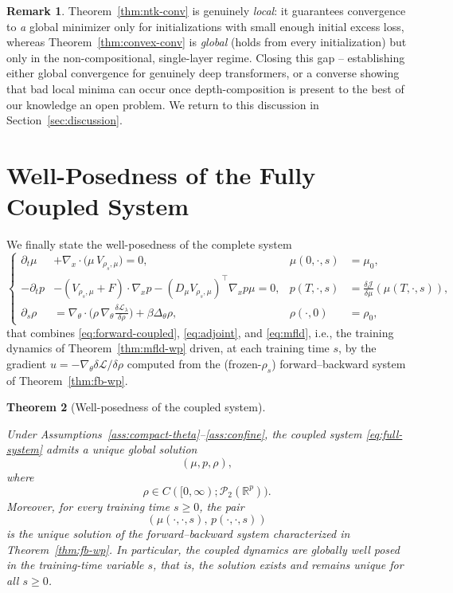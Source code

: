 \documentclass[11pt,a4wide]{article}
\newtheorem{theorem}{Theorem}[section]
\theoremstyle{definition}
\newtheorem{remark}[theorem]{Remark}
\newcommand{\R}{\mathbb{R}}
\newcommand{\Prob}{\mathcal{P}}
\begin{document}
\begin{remark}
Theorem~\ref{thm:ntk-conv} is genuinely \emph{local}: it guarantees convergence to \emph{a} global minimizer only for initializations with small enough initial excess loss, whereas Theorem~\ref{thm:convex-conv} is \emph{global} (holds from every initialization) but only in the non-compositional, single-layer regime. Closing this gap -- establishing either global convergence for genuinely deep transformers, or a converse showing that bad local minima can occur once depth-composition is present  to the best of our knowledge  an open problem. We return to this discussion in Section~\ref{sec:discussion}.
\end{remark}

\section{Well-Posedness of the Fully Coupled System}
\label{sec:coupled}

We finally state the well-posedness of the complete system
\begin{equation}
\left\{
\begin{aligned}
\partial_t\mu &+ \nabla_x\cdot\big(\mu\,V_{\rho_s,\mu}\big) = 0, & \mu(0,\cdot,s)&=\mu_0,\\
-\partial_tp &- (V_{\rho_s,\mu}+F)\cdot\nabla_xp - (D_\mu V_{\rho_s,\mu})^\top \nabla_x p \mu  = 0, & p(T,\cdot,s) &= \tfrac{\delta\mathcal J}{\delta\mu}(\mu(T,\cdot,s)),\\
\partial_s\rho &= \nabla_\theta\cdot\big(\rho\,\nabla_\theta\tfrac{\delta\mathcal L_\lambda}{\delta\rho}\big) + \beta\Delta_\theta\rho, & \rho(\cdot,0) &= \rho_0,
\end{aligned}
\right.
\label{eq:full-system}
\end{equation}
that combines \eqref{eq:forward-coupled}, \eqref{eq:adjoint}, and \eqref{eq:mfld}, i.e., the training dynamics of Theorem~\ref{thm:mfld-wp} driven, at each training time $s$, by the gradient $u=-\nabla_\theta\delta\mathcal L/\delta\rho$ computed from the (frozen-$\rho_s$) forward--backward system of Theorem~\ref{thm:fb-wp}.

\begin{theorem}[Well-posedness of the coupled system]
\label{thm:full-wp}

Under Assumptions~\ref{ass:compact-theta}--\ref{ass:confine}, the coupled system
\eqref{eq:full-system} admits a unique global solution
\[
(\mu,p,\rho),
\]
where
\[
\rho\in C([0,\infty);\Prob_2(\mathbb R^p)).
\]
Moreover, for every training time $s\ge0$, the pair
\[
(\mu(\cdot,\cdot,s),\,p(\cdot,\cdot,s))
\]
is the unique solution of the forward--backward system characterized in
Theorem~\ref{thm:fb-wp}. In particular, the coupled dynamics are globally
well posed in the training-time variable $s$, that is, the solution exists
and remains unique for all $s\ge0$.
\end{theorem}
\end{document}
